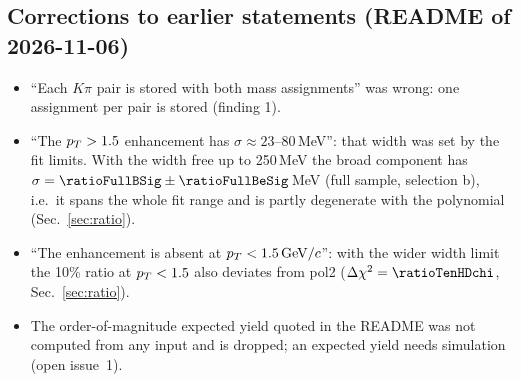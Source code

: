 \subsection*{Corrections to earlier statements (README of 2026-11-06)}
\begin{itemize}
\item ``Each $K\pi$ pair is stored with both mass assignments'' was wrong: one assignment per pair is stored (finding 1).
\item ``The $p_T>1.5$ enhancement has $\sigma\approx23$--80\,MeV'': that width was set by the fit limits. With the width
  free up to 250\,MeV the broad component has $\sigma=\ratioFullBSig\pm\ratioFullBeSig$\,MeV (full sample, selection b),
  i.e.\ it spans the whole fit range and is partly degenerate with the polynomial (Sec.~\ref{sec:ratio}).
\item ``The enhancement is absent at $p_T<1.5\,\mathrm{GeV}/c$'': with the wider width limit the 10\% ratio at $p_T<1.5$ also
  deviates from pol2 ($\Delta\chi^2=\ratioTenHDchi$, Sec.~\ref{sec:ratio}).
\item The order-of-magnitude expected \Dzero{} yield quoted in the README was not computed from any input and is
  dropped; an expected yield needs simulation (open issue~1).
\end{itemize}
